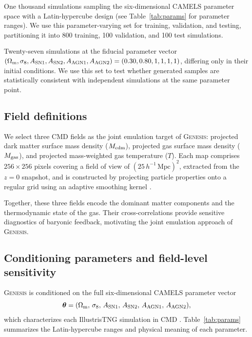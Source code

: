 \documentclass[usenatbib]{mnras}
\newcommand{\Mcdm}{M_{\rm cdm}}
\newcommand{\Mgas}{M_{\rm gas}}
\newcommand{\Tgas}{T}
\newcommand{\Om}{\Omega_{\rm m}}
\newcommand{\sig}{\sigma_8}
\begin{document}
\begin{description}[font=\normalfont\bfseries,leftmargin=2.2em,labelsep=0.6em]
  \item[LH set.] One thousand simulations sampling the
        six-dimensional CAMELS parameter space with a Latin-hypercube
        design (see Table~\ref{tab:params} for parameter ranges).
        We use this parameter-varying set for training, validation,
        and testing, partitioning it into 800 training, 100
        validation, and 100 test simulations.
  \item[CV set.] Twenty-seven simulations at the fiducial parameter
        vector $(\Om, \sig, A_{\rm SN1}, A_{\rm SN2}, A_{\rm AGN1},
        A_{\rm AGN2}) = (0.30, 0.80, 1, 1, 1, 1)$, differing only
        in their initial conditions. We use this set to test whether
        generated samples are statistically consistent with
        independent simulations at the same parameter point.
\end{description}

\subsection{Field definitions}
\label{sec:fields}

We select three CMD fields as the joint emulation target of
\textsc{Genesis}: projected dark matter surface mass density
($\Mcdm$), projected gas surface mass density ($\Mgas$), and projected
mass-weighted gas temperature ($\Tgas$). Each map comprises
$256\times256$ pixels covering a field of view of
$(25\,h^{-1}\,\mathrm{Mpc})^2$, extracted from the $z=0$ snapshot, and
is constructed by projecting particle properties onto a regular grid
using an adaptive smoothing kernel \citep{Villaescusa2022}.

Together, these three fields encode the dominant matter components and
the thermodynamic state of the gas. Their cross-correlations provide
sensitive diagnostics of baryonic feedback, motivating the joint
emulation approach of \textsc{Genesis}.

\subsection{Conditioning parameters and field-level sensitivity}
\label{sec:params}

\textsc{Genesis} is conditioned on the full six-dimensional CAMELS
parameter vector
\begin{equation}
  \boldsymbol{\theta} =
  (\Om,\,\sig,\,A_{\rm SN1},\,A_{\rm SN2},\,A_{\rm AGN1},\,A_{\rm AGN2}),
  \label{eq:theta}
\end{equation}
which characterizes each IllustrisTNG simulation in CMD
\citep{Villaescusa2021,Villaescusa2022}.
Table~\ref{tab:params} summarizes the Latin-hypercube ranges and
physical meaning of each parameter.
\end{document}
